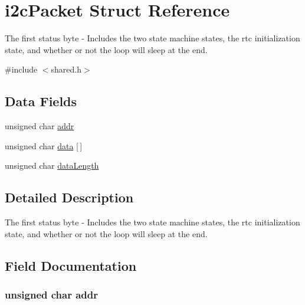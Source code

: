 \hypertarget{structi2c_packet}{}\section{i2c\+Packet Struct Reference}
\label{structi2c_packet}


The first status byte -\/ Includes the two state machine states, the rtc initialization state, and whether or not the loop will sleep at the end.  




{\ttfamily \#include $<$shared.\+h$>$}

\subsection*{Data Fields}
\begin{DoxyCompactItemize}
\item 
unsigned char \hyperlink{structi2c_packet_a4c34a946600e9d68b6355d23f54d291b}{addr}
\item 
unsigned char \hyperlink{structi2c_packet_ad22557485286d9df959ff3335001ce69}{data} \mbox{[}$\,$\mbox{]}
\item 
unsigned char \hyperlink{structi2c_packet_ab75048efd066658a4bd4e95b916f7f91}{data\+Length}
\end{DoxyCompactItemize}


\subsection{Detailed Description}
The first status byte -\/ Includes the two state machine states, the rtc initialization state, and whether or not the loop will sleep at the end. 

\subsection{Field Documentation}
\hypertarget{structi2c_packet_a4c34a946600e9d68b6355d23f54d291b}{}
\subsubsection[{addr}]{\setlength{\rightskip}{0pt plus 5cm}unsigned char addr}\label{structi2c_packet_a4c34a946600e9d68b6355d23f54d291b}
\hypertarget{structi2c_packet_ad22557485286d9df959ff3335001ce69}{}
